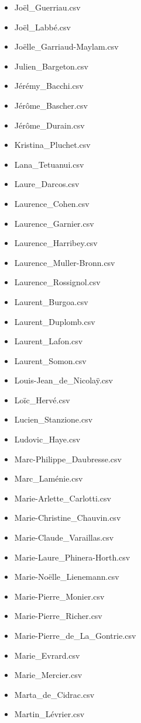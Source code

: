 \documentclass[a4paper,12pt,twoside]{book}
\begin{document}
\begin{itemize}
  \item Joël\_Guerriau.csv
  \item Joël\_Labbé.csv
  \item Joëlle\_Garriaud-Maylam.csv
  \item Julien\_Bargeton.csv
  \item Jérémy\_Bacchi.csv
  \item Jérôme\_Bascher.csv
  \item Jérôme\_Durain.csv
  \item Kristina\_Pluchet.csv
  \item Lana\_Tetuanui.csv
  \item Laure\_Darcos.csv
  \item Laurence\_Cohen.csv
  \item Laurence\_Garnier.csv
  \item Laurence\_Harribey.csv
  \item Laurence\_Muller-Bronn.csv
  \item Laurence\_Rossignol.csv
  \item Laurent\_Burgoa.csv
  \item Laurent\_Duplomb.csv
  \item Laurent\_Lafon.csv
  \item Laurent\_Somon.csv
  \item Louis-Jean\_de\_Nicolaÿ.csv
  \item Loïc\_Hervé.csv
  \item Lucien\_Stanzione.csv
  \item Ludovic\_Haye.csv
  \item Marc-Philippe\_Daubresse.csv
  \item Marc\_Laménie.csv
  \item Marie-Arlette\_Carlotti.csv
  \item Marie-Christine\_Chauvin.csv
  \item Marie-Claude\_Varaillas.csv
  \item Marie-Laure\_Phinera-Horth.csv
  \item Marie-Noëlle\_Lienemann.csv
  \item Marie-Pierre\_Monier.csv
  \item Marie-Pierre\_Richer.csv
  \item Marie-Pierre\_de\_La\_Gontrie.csv
  \item Marie\_Evrard.csv
  \item Marie\_Mercier.csv
  \item Marta\_de\_Cidrac.csv
  \item Martin\_Lévrier.csv

\end{itemize}
\end{document}

